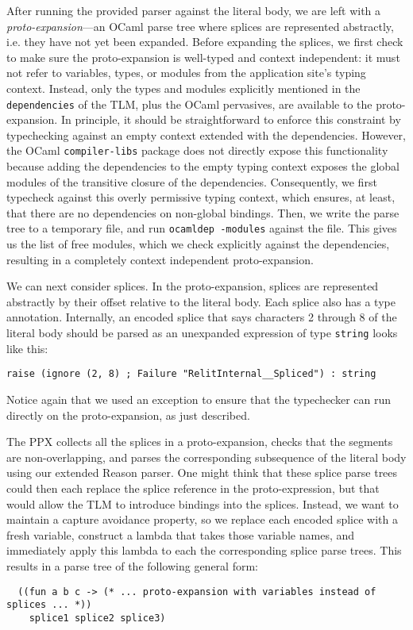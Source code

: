 \documentclass[acmsmall,review]{acmart}
\newcommand{\li}[1]{\lstinline[basicstyle=\ttfamily\fontsize{9pt}{1em}\selectfont]{#1}}
\theoremstyle{slplain}
\numberwithin{thm}{section}
\begin{document}
After running the provided parser against the literal body, we are left with a \emph{proto-expansion}---an OCaml parse tree where splices are represented abstractly, i.e. they have not yet been expanded. Before expanding the splices, we first check to make sure the proto-expansion is well-typed and context independent: it must not refer to variables, types, or modules from the application site's typing context. Instead, only the types and modules explicitly mentioned in the \li{dependencies} of the TLM, plus the OCaml pervasives, are available to the proto-expansion. In principle, it should be straightforward to enforce this constraint by typechecking against an empty context extended with the dependencies. However, the OCaml \li{compiler-libs} package does not directly expose this functionality because adding the dependencies to the empty typing context exposes the global modules of the transitive closure of the dependencies. 
Consequently, we first typecheck against this overly permissive typing context, which ensures, at least, that there are no dependencies on non-global bindings. Then, we write the parse tree to a temporary file, and run \li{ocamldep -modules} against the file. This gives us the list of free modules, which we check explicitly against the dependencies, resulting in a completely context independent proto-expansion.

We can next consider splices. In the proto-expansion, splices are represented abstractly by their offset relative to the literal body. Each splice also has a type annotation. Internally, an encoded splice that says characters 2 through 8 of the literal body should be parsed as an unexpanded expression of type \li{string} looks like this:
\begin{lstlisting}[numbers=none]
  raise (ignore (2, 8) ; Failure "RelitInternal__Spliced") : string
\end{lstlisting}
Notice again that we used an exception to ensure that the typechecker can run directly on the proto-expansion, as just described. 

The PPX collects all the splices in a proto-expansion, checks that the segments are non-overlapping, and parses the corresponding subsequence of the literal body using our extended Reason parser. One might think that these splice parse trees could then each replace the splice reference in the proto-expression, but that would allow the TLM to introduce bindings into the splices. Instead, we want to maintain a capture avoidance property, so we replace each encoded splice with a fresh variable, construct a lambda that takes those variable names, and immediately apply this lambda to each the corresponding splice parse trees. This results in a parse tree of the following general form:
\begin{lstlisting}
  ((fun a b c -> (* ... proto-expansion with variables instead of splices ... *)) 
    splice1 splice2 splice3)
\end{lstlisting}
\end{document}
